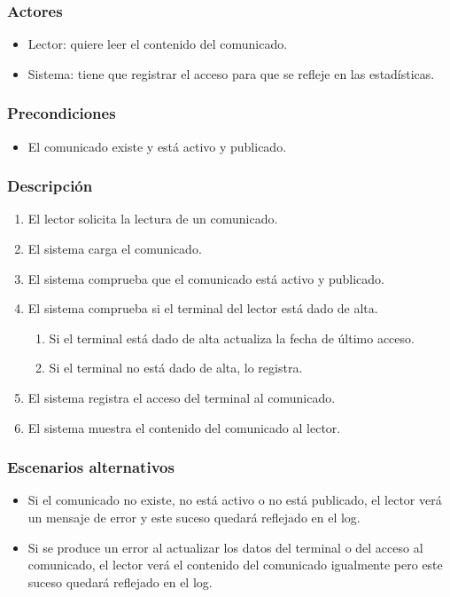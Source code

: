 \subsubsection*{Actores}
\begin{itemize}
    \item Lector: quiere leer el contenido del comunicado.
    \item Sistema: tiene que registrar el acceso para que se refleje en las estadísticas.
\end{itemize}

\subsubsection*{Precondiciones}
\begin{itemize}
    \item El comunicado existe y está activo y publicado.
\end{itemize}

\subsubsection*{Descripción}

\begin{enumerate}
    \item El lector solicita la lectura de un comunicado.
    \item El sistema carga el comunicado.
    \item El sistema comprueba que el comunicado está activo y publicado.
    \item El sistema comprueba si el terminal del lector está dado de alta.
    \begin{enumerate}
        \item Si el terminal está dado de alta actualiza la fecha de último acceso.
        \item Si el terminal no está dado de alta, lo registra.
    \end{enumerate}
    \item El sistema registra el acceso del terminal al comunicado.
    \item El sistema muestra el contenido del comunicado al lector.
\end{enumerate}

\subsubsection*{Escenarios alternativos}
\begin{itemize}
    \item Si el comunicado no existe, no está activo o no está publicado, el lector verá un mensaje de error y este suceso quedará reflejado en el log.
    \item Si se produce un error al actualizar los datos del terminal o del acceso al comunicado, el lector verá el contenido del comunicado igualmente pero este suceso quedará reflejado en el log.
\end{itemize}

